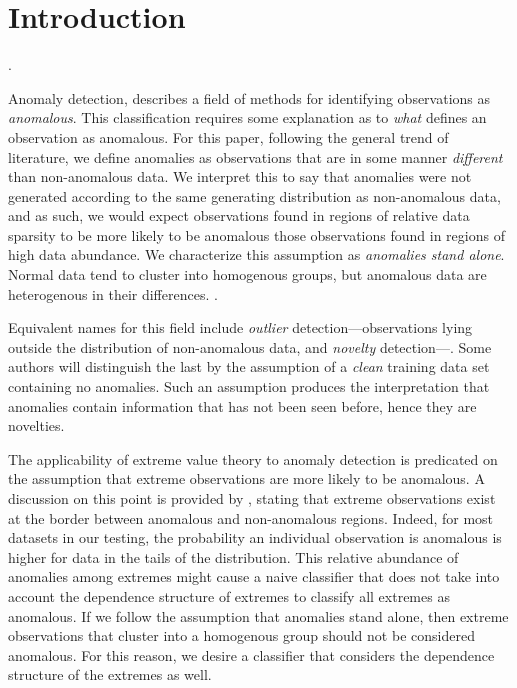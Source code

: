 \section{Introduction}


.

Anomaly detection, describes a field of methods for identifying observations as \emph{anomalous}.
    This classification requires some explanation as to \emph{what} defines an observation as anomalous.
    For this paper, following the general trend of literature, we define anomalies
    as observations that are in some manner \emph{different} than non-anomalous data. We interpret this to
    say that anomalies were not generated according to the same generating distribution as non-anomalous data,
    and as such, we would expect observations found in regions of relative data sparsity to be more likely to be
    anomalous those observations found in regions of high data abundance.  We characterize this assumption
    as \emph{anomalies stand alone}.  Normal data tend to cluster into homogenous groups, but anomalous data are
    heterogenous in their differences.
    .

    Equivalent names for this field include \emph{outlier} detection---observations lying outside the
    distribution of non-anomalous data, and \emph{novelty} detection---.  Some authors will
    distinguish the last by the assumption of a \emph{clean} training data set containing no anomalies.  Such
    an assumption produces the interpretation that anomalies contain information that has not been seen before,
    hence they are novelties.

The applicability of extreme value theory to anomaly detection is predicated on the assumption that
  extreme observations are more likely to be anomalous.  A discussion on this point is provided by \cite{goix2017},
  stating that extreme observations exist at the border between anomalous and non-anomalous regions.  Indeed,
  for most datasets in our testing, the probability an individual observation is anomalous is higher
  for data in the tails of the distribution. This relative abundance of anomalies among extremes might 
  cause a naive classifier that does not take into account the dependence structure of extremes to 
  classify all extremes as anomalous.  If we follow the assumption that anomalies stand alone, then extreme
  observations that cluster into a homogenous group should not be considered anomalous.  For this reason, we
  desire a classifier that considers the dependence structure of the extremes as well.

